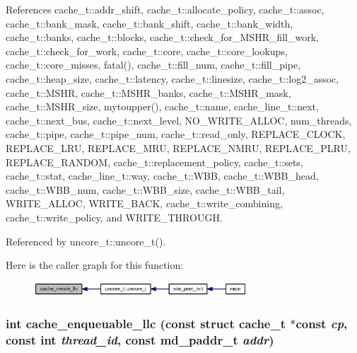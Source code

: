 References cache\_\-t::addr\_\-shift, cache\_\-t::allocate\_\-policy, cache\_\-t::assoc, cache\_\-t::bank\_\-mask, cache\_\-t::bank\_\-shift, cache\_\-t::bank\_\-width, cache\_\-t::banks, cache\_\-t::blocks, cache\_\-t::check\_\-for\_\-MSHR\_\-fill\_\-work, cache\_\-t::check\_\-for\_\-work, cache\_\-t::core, cache\_\-t::core\_\-lookups, cache\_\-t::core\_\-misses, fatal(), cache\_\-t::fill\_\-num, cache\_\-t::fill\_\-pipe, cache\_\-t::heap\_\-size, cache\_\-t::latency, cache\_\-t::linesize, cache\_\-t::log2\_\-assoc, cache\_\-t::MSHR, cache\_\-t::MSHR\_\-banks, cache\_\-t::MSHR\_\-mask, cache\_\-t::MSHR\_\-size, mytoupper(), cache\_\-t::name, cache\_\-line\_\-t::next, cache\_\-t::next\_\-bus, cache\_\-t::next\_\-level, NO\_\-WRITE\_\-ALLOC, num\_\-threads, cache\_\-t::pipe, cache\_\-t::pipe\_\-num, cache\_\-t::read\_\-only, REPLACE\_\-CLOCK, REPLACE\_\-LRU, REPLACE\_\-MRU, REPLACE\_\-NMRU, REPLACE\_\-PLRU, REPLACE\_\-RANDOM, cache\_\-t::replacement\_\-policy, cache\_\-t::sets, cache\_\-t::stat, cache\_\-line\_\-t::way, cache\_\-t::WBB, cache\_\-t::WBB\_\-head, cache\_\-t::WBB\_\-num, cache\_\-t::WBB\_\-size, cache\_\-t::WBB\_\-tail, WRITE\_\-ALLOC, WRITE\_\-BACK, cache\_\-t::write\_\-combining, cache\_\-t::write\_\-policy, and WRITE\_\-THROUGH.

Referenced by uncore\_\-t::uncore\_\-t().

Here is the caller graph for this function:\nopagebreak
\begin{figure}[H]
\begin{center}
\leavevmode
\includegraphics[width=226pt]{zesto-llc_8cpp_727c4cbf039edb120fe825803e69067f_icgraph}
\end{center}
\end{figure}
\subsubsection[{cache\_\-enqueuable\_\-llc}]{\setlength{\rightskip}{0pt plus 5cm}int cache\_\-enqueuable\_\-llc (const struct {\bf cache\_\-t} $\ast$const  {\em cp}, \/  const int {\em thread\_\-id}, \/  const {\bf md\_\-paddr\_\-t} {\em addr})}\label{zesto-llc_8cpp_17919e2800a0393570b40f08156cb42c}




